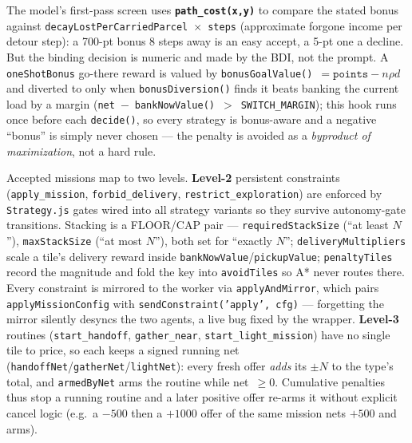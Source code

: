 The model's first-pass screen uses \textbf{\texttt{path\_cost(x,y)}} to compare the stated bonus against \texttt{decayLostPerCarriedParcel}~$\times$~\texttt{steps} (approximate forgone income per detour step): a 700-pt bonus 8 steps away is an easy accept, a 5-pt one a decline. But the binding decision is numeric and made by the BDI, not the prompt. A \texttt{oneShotBonus} go-there reward is valued by \texttt{bonusGoalValue()}~$= \texttt{points} - n\rho d$ and diverted to only when \texttt{bonusDiversion()} finds it beats banking the current load by a margin (\texttt{net}~$-$~\texttt{bankNowValue()}~$>$~\texttt{SWITCH\_MARGIN}); this hook runs once before each \texttt{decide()}, so every strategy is bonus-aware and a negative ``bonus'' is simply never chosen --- the penalty is avoided as a \textit{byproduct of maximization}, not a hard rule.

Accepted missions map to two levels. \textbf{Level-2} persistent constraints (\texttt{apply\_mission}, \texttt{forbid\_delivery}, \texttt{restrict\_exploration}) are enforced by \texttt{Strategy.js} gates wired into all strategy variants so they survive autonomy-gate transitions. Stacking is a FLOOR/CAP pair --- \texttt{requiredStackSize} (``at least $N$''), \texttt{maxStackSize} (``at most $N$''), both set for ``exactly $N$''; \texttt{deliveryMultipliers} scale a tile's delivery reward inside \texttt{bankNowValue}/\texttt{pickupValue}; \texttt{penaltyTiles} record the magnitude and fold the key into \texttt{avoidTiles} so A* never routes there. Every constraint is mirrored to the worker via \texttt{applyAndMirror}, which pairs \texttt{applyMissionConfig} with \texttt{sendConstraint('apply', cfg)} — forgetting the mirror silently desyncs the two agents, a live bug fixed by the wrapper. \textbf{Level-3} routines (\texttt{start\_handoff}, \texttt{gather\_near}, \texttt{start\_light\_mission}) have no single tile to price, so each keeps a signed running net (\texttt{handoffNet}/\texttt{gatherNet}/\texttt{lightNet}): every fresh offer \textit{adds} its $\pm N$ to the type's total, and \texttt{armedByNet} arms the routine while net~$\geq 0$. Cumulative penalties thus stop a running routine and a later positive offer re-arms it without explicit cancel logic (e.g.\ a $-500$ then a $+1000$ offer of the same mission nets $+500$ and arms).


